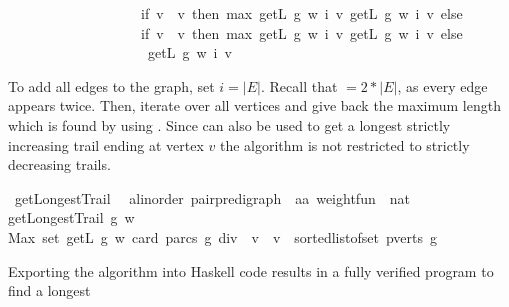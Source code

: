 \begin{isabellebody}
\ \ \ \ \ \ \ \ \ \ \ \ \ \ \ \ \ \ \ {\isacharparenleft}if\ v\ {\isacharequal}\ v\ then\ max\ {\isacharparenleft}{\isacharparenleft}getL\ g\ w\ i\ v\ {\isacharparenleft}getL\ g\ w\ i\ v{\isacharparenright}\ else\ \isanewline
\ \ \ \ \ \ \ \ \ \ \ \ \ \ \ \ \ \ \ {\isacharparenleft}if\ v\ {\isacharequal}\ v\ then\ max\ {\isacharparenleft}{\isacharparenleft}getL\ g\ w\ i\ v\ {\isacharparenleft}getL\ g\ w\ i\ v{\isacharparenright}\ else\ \isanewline
\ \ \ \ \ \ \ \ \ \ \ \ \ \ \ \ \ \ \ \ getL\ g\ w\ i\ v{\isacharparenright}{\isacharparenright}{\isacharparenright}{\isachardoublequoteclose}%
\begin{isamarkuptext}%
To add all edges to the graph, set $i=|E|$. Recall that  $= 2*|E|$, 
as every edge appears twice. 
Then, iterate over all vertices and give back the
maximum length which is found by using . Since  can also be used to get a longest 
strictly increasing trail ending at vertex $v$ the algorithm is not restricted to strictly decreasing trails.%
\end{isamarkuptext}\isamarkuptrue%
\isamarkupfalse%
\ getLongestTrail\ {\isacharcolon}{\isacharcolon}\ \isanewline
{\isachardoublequoteopen}{\isacharparenleft}{\isacharprime}a{\isacharcolon}{\isacharcolon}linorder{\isacharparenright}\ pair{\isacharunderscore}pre{\isacharunderscore}digraph\ {\isasymRightarrow}\ {\isacharparenleft}{\isacharprime}a{\isasymtimes}{\isacharprime}a{\isacharparenright}\ weight{\isacharunderscore}fun\ {\isasymRightarrow}\ nat{\isachardoublequoteclose}\ \isanewline
{\isachardoublequoteopen}getLongestTrail\ g\ w\ {\isacharequal}\ \isanewline
Max\ {\isacharparenleft}set\ {\isacharbrackleft}{\isacharparenleft}getL\ g\ w\ {\isacharparenleft}card\ {\isacharparenleft}parcs\ g{\isacharparenright}\ div\ {}{\isacharparenright}\ v{\isacharparenright}\ {\isachardot}\ v\ {\isacharless}{\isacharminus}\ sorted{\isacharunderscore}list{\isacharunderscore}of{\isacharunderscore}set\ {\isacharparenleft}pverts\ g{\isacharparenright}{\isacharbrackright}{\isacharparenright}{\isachardoublequoteclose}%
\begin{isamarkuptext}%
Exporting the algorithm into Haskell code results in a fully verified program to find a longest

\end{isamarkuptext}
\end{isabellebody}
